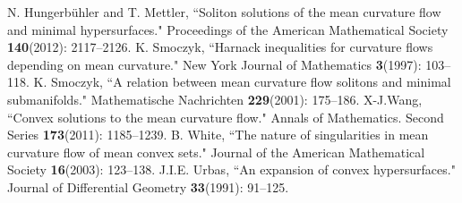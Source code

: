 \documentclass{amsart}
\theoremstyle{definition}
\theoremstyle{remark}
\numberwithin{equation}{section}
\begin{document}
\begin{thebibliography}{10}
 N. Hungerb{\"u}hler and T. Mettler, ``Soliton solutions of the mean curvature flow and minimal hypersurfaces." Proceedings of the American Mathematical Society \textbf{140}(2012): 2117--2126.
 K. Smoczyk, ``Harnack inequalities for curvature flows depending on mean curvature." New York Journal of Mathematics \textbf{3}(1997): 103--118.
 K. Smoczyk, ``A relation between mean curvature flow solitons and minimal submanifolds." Mathematische Nachrichten \textbf{229}(2001): 175--186.
 X-J.Wang, ``Convex solutions to the mean curvature flow." Annals of Mathematics. Second Series \textbf{173}(2011): 1185--1239.
 B. White, ``The nature of singularities in mean curvature flow of mean convex sets." Journal of the American Mathematical Society \textbf{16}(2003): 123--138.
 J.I.E. Urbas, ``An expansion of convex hypersurfaces." Journal of Differential Geometry \textbf{33}(1991): 91--125.
\end{thebibliography}
\end{document}
